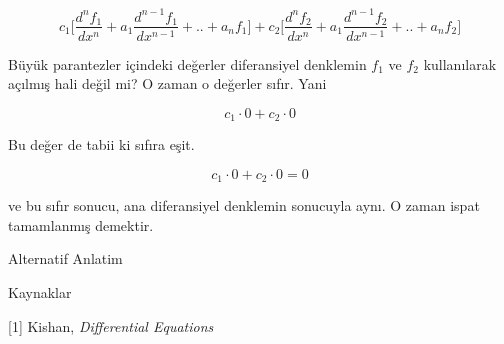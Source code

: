 \documentclass[12pt,fleqn]{article}\usepackage{../../common}
\begin{document}
$$ 
c_1 \bigg[
\frac{d^nf_1}{dx^n} + a_1 \frac{d^{n-1}f_1}{dx^{n-1}} + .. + a_n f_1
\bigg] +
c_2 \bigg[
\frac{d^nf_2}{dx^n} + a_1 \frac{d^{n-1}f_2}{dx^{n-1}} + .. + a_n f_2
\bigg]
 $$

Büyük parantezler içindeki değerler diferansiyel denklemin $f_1$ ve $f_2$
kullanılarak açılmış hali değil mi? O zaman o değerler sıfır. Yani

$$ c_1 \cdot 0 + c_2 \cdot 0 $$

Bu değer de tabii ki sıfıra eşit. 

$$ c_1 \cdot 0 + c_2 \cdot 0 = 0$$

ve bu sıfır sonucu, ana diferansiyel denklemin sonucuyla aynı. O zaman ispat
tamamlanmış demektir.

Alternatif Anlatim



Kaynaklar 

[1] Kishan, {\em Differential Equations}
\end{document}
